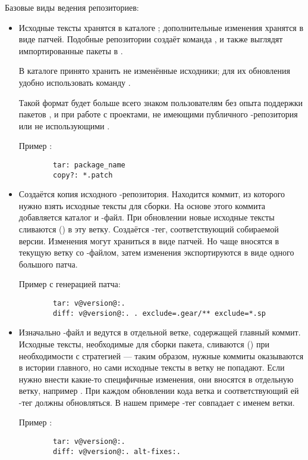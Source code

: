 Базовые виды ведения  репозиториев:
\begin{itemize}
	\item {}
	
	Исходные тексты хранятся в каталоге ; дополнительные изменения хранятся в виде патчей. 
		Подобные репозитории создаёт команда , и также выглядят импортированные 
		пакеты в .
	
	В каталоге  принято хранить не изменённые исходники; для их обновления удобно 
		использовать команду .
	
	Такой формат будет больше всего знаком пользователям без опыта поддержки пакетов , 
		и при работе с проектами, не имеющими публичного -репозитория или не использующими .
	
	Пример :
	\begin{verbatim}
		tar: package_name
		copy?: *.patch
	\end{verbatim} 
	
	\item {}
	
	Создаётся копия исходного -репозитория. Находится коммит, из которого нужно взять исходные 
		тексты для сборки. На основе этого коммита добавляется каталог  и -файл. 
		При обновлении новые исходные тексты сливаются () в эту ветку. Создаётся -тег, 
		соответствующий собираемой версии. Изменения могут храниться в виде патчей. Но чаще вносятся в 
		текущую ветку со -файлом, затем изменения экспортируются в виде одного большого патча. 
	
	Пример  с генерацией патча:
	\begin{verbatim}
		tar: v@version@:.
		diff: v@version@:. . exclude=.gear/** exclude=*.sp
	\end{verbatim}
	
	\item {}
	
	Изначально -файл и  ведутся в отдельной ветке, содержащей главный коммит. 
		Исходные тексты, необходимые для сборки пакета, сливаются () при необходимости 
		с  стратегией  --- таким образом, нужные коммиты оказываются в истории 
		главного, но сами исходные тексты в ветку не попадают. Если нужно внести какие-то специфичные 
		изменения, они вносятся в отдельную ветку, например . При каждом обновлении 
		кода ветка  и соответствующий ей -тег должны обновляться. В нашем 
		примере -тег совпадает с именем ветки. 
	
	Пример :
	\begin{verbatim}
		tar: v@version@:.
		diff: v@version@:. alt-fixes:.
	\end{verbatim} 
\end{itemize}


